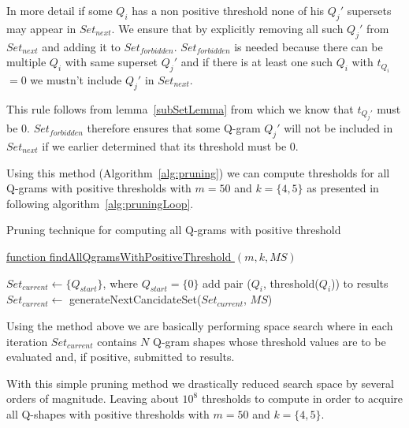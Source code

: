 \documentclass[paper=a4, fontsize=11pt]{scrartcl} %
\numberwithin{equation}{section} %
\numberwithin{figure}{section} %
\numberwithin{table}{section} %
\begin{document}
In more detail if some $Q_{i}$ has a non positive threshold none of his $Q_{j}'$
supersets may appear in $Set_{next}$. We ensure that by explicitly removing
all such $Q_{j}'$ from $Set_{next}$ and adding it to $Set_{forbidden}$.
$Set_{forbidden}$ is needed because there can be multiple $Q_{i}$ with same
superset $Q_{j}'$ and if there is at least one such $Q_{i}$ with
$t_{Q_{i}}$ $= 0$ we mustn't include $Q_{j}'$ in $Set_{next}$.

This rule follows from lemma~\ref{subSetLemma} from which we know that
$t_{Q_{j}'}$ must be $0$. $Set_{forbidden}$ therefore ensures that some
Q-gram $Q_{j}'$ will not be included in $Set_{next}$ if we earlier determined
that its threshold must be $0$.

Using this method (Algorithm~\ref{alg:pruning}) we can compute thresholds for
all Q-grams with positive thresholds with $m=50$ and $k=\{4,5\}$ as presented in following
algorithm~\ref{alg:pruningLoop}.

\begin{algorithm}[H]
\caption{Pruning technique for computing all Q-grams with positive threshold}
\label{alg:pruningLoop}

\underline{function findAllQgramsWithPositiveThreshold } $(m,k,MS)$\;



\begin{algorithmic}
	\STATE $Set_{current} \gets \{Q_{start}\}$, where $Q_{start} = \{0\}$
			\STATE add pair ($Q_{i}$, threshold($Q_{i}$)) to results
			\ENDIF
			\STATE $Set_{current} \gets$ generateNextCancidateSet($Set_{current}$, $MS$)
		\ENDFOR	
\end{algorithmic}

\end{algorithm}

Using the method above we are basically performing space search where in each
iteration $Set_{current}$ contains $N$ Q-gram shapes whose threshold values are
to be evaluated and, if positive, submitted to results.

With this simple pruning method we drastically reduced search space by
several orders of magnitude. Leaving about $10^{8}$ thresholds to compute in order to
acquire all Q-shapes with positive thresholds with $m=50$ and $k=\{4,5\}$.
\end{document}

